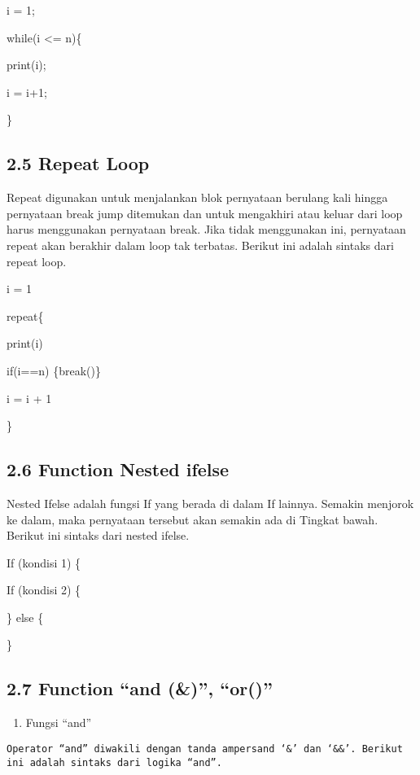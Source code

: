 \documentclass[
]{article}
\providecommand{\tightlist}{%
  \setlength{\itemsep}{0pt}\setlength{\parskip}{0pt}}
\begin{document}
i = 1;

while(i \textless= n)\{

print(i);

i = i+1;

\}

\subsection{2.5 Repeat Loop}\label{repeat-loop}

Repeat digunakan untuk menjalankan blok pernyataan berulang kali hingga
pernyataan break jump ditemukan dan untuk mengakhiri atau keluar dari
loop harus menggunakan pernyataan break. Jika tidak menggunakan ini,
pernyataan repeat akan berakhir dalam loop tak terbatas. Berikut ini
adalah sintaks dari repeat loop.

i = 1

repeat\{

print(i)

if(i==n) \{break()\}

i = i + 1

\}

\subsection{2.6 Function Nested ifelse}\label{function-nested-ifelse}

Nested Ifelse adalah fungsi If yang berada di dalam If lainnya. Semakin
menjorok ke dalam, maka pernyataan tersebut akan semakin ada di Tingkat
bawah. Berikut ini sintaks dari nested ifelse.

If (kondisi 1) \{

If (kondisi 2) \{

\} else \{

\}

\subsection{2.7 Function ``and (\&)'',
``or(\textbar)''}\label{function-and-or}

\begin{enumerate}
\def\labelenumi{\arabic{enumi}.}
\tightlist
\item
  Fungsi ``and''
\end{enumerate}

\begin{verbatim}
Operator “and” diwakili dengan tanda ampersand ‘&’ dan ‘&&’. Berikut ini adalah sintaks dari logika “and”.
\end{verbatim}
\end{document}
